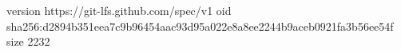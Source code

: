 version https://git-lfs.github.com/spec/v1
oid sha256:d2894b351eea7c9b96454aac93d95a022e8a8ee2244b9aceb0921fa3b56ee54f
size 2232
